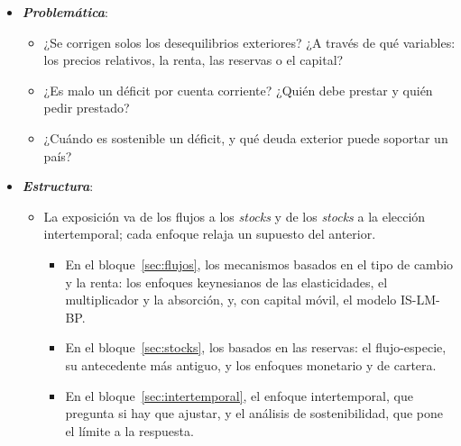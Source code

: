 \documentclass[11pt]{article}
\begin{document}
\begin{itemize}
\item \textbf{\emph{Problemática}}:
  \begin{itemize}
  \item ¿Se corrigen solos los desequilibrios exteriores? ¿A través de qué variables: los precios relativos, la renta, las reservas o el capital?
  \item ¿Es malo un déficit por cuenta corriente? ¿Quién debe prestar y quién pedir prestado?
  \item ¿Cuándo es sostenible un déficit, y qué deuda exterior puede soportar un país?
  \end{itemize}

\item \textbf{\emph{Estructura}}:
  \begin{itemize}
  \item La exposición va de los flujos a los \emph{stocks} y de los \emph{stocks} a la elección intertemporal; cada enfoque relaja un supuesto del anterior.
    \begin{itemize}
    \item En el bloque~\ref{sec:flujos}, los mecanismos basados en el tipo de cambio y la renta: los enfoques keynesianos de las elasticidades, el multiplicador y la absorción, y, con capital móvil, el modelo IS-LM-BP.
    \item En el bloque~\ref{sec:stocks}, los basados en las reservas: el flujo-especie, su antecedente más antiguo, y los enfoques monetario y de cartera.
    \item En el bloque~\ref{sec:intertemporal}, el enfoque intertemporal, que pregunta si hay que ajustar, y el análisis de sostenibilidad, que pone el límite a la respuesta.
    \end{itemize}
  \end{itemize}
\end{itemize}
\end{document}
